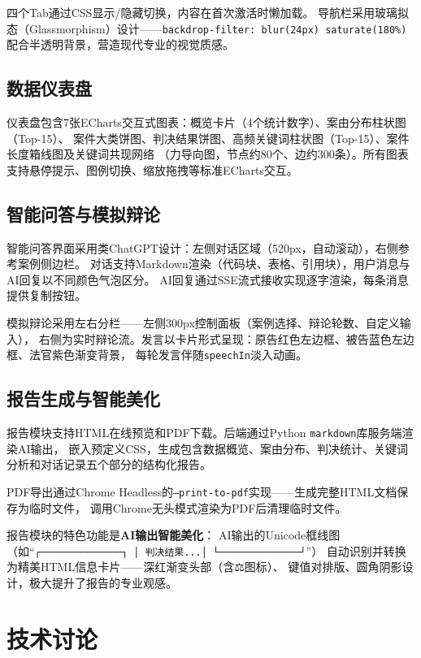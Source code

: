 \documentclass[12pt,a4paper,twoside]{ctexart}
\begin{document}
四个Tab通过CSS显示/隐藏切换，内容在首次激活时懒加载。
导航栏采用玻璃拟态（Glassmorphism）设计——\texttt{backdrop-filter: blur(24px) saturate(180\%)}
配合半透明背景，营造现代专业的视觉质感。

\subsection{数据仪表盘}

仪表盘包含7张ECharts交互式图表：概览卡片（4个统计数字）、案由分布柱状图（Top-15）、
案件大类饼图、判决结果饼图、高频关键词柱状图（Top-15）、案件长度箱线图及关键词共现网络
（力导向图，节点约80个、边约300条）。所有图表支持悬停提示、图例切换、缩放拖拽等标准ECharts交互。

\subsection{智能问答与模拟辩论}

智能问答界面采用类ChatGPT设计：左侧对话区域（520px，自动滚动），右侧参考案例侧边栏。
对话支持Markdown渲染（代码块、表格、引用块），用户消息与AI回复以不同颜色气泡区分。
AI回复通过SSE流式接收实现逐字渲染，每条消息提供复制按钮。

模拟辩论采用左右分栏——左侧300px控制面板（案例选择、辩论轮数、自定义输入），
右侧为实时辩论流。发言以卡片形式呈现：原告红色左边框、被告蓝色左边框、法官紫色渐变背景，
每轮发言伴随\texttt{speechIn}淡入动画。

\subsection{报告生成与智能美化}

报告模块支持HTML在线预览和PDF下载。后端通过Python \texttt{markdown}库服务端渲染AI输出，
嵌入预定义CSS，生成包含数据概览、案由分布、判决统计、关键词分析和对话记录五个部分的结构化报告。

PDF导出通过Chrome Headless的\texttt{--print-to-pdf}实现——生成完整HTML文档保存为临时文件，
调用Chrome无头模式渲染为PDF后清理临时文件。

报告模块的特色功能是\textbf{AI输出智能美化}：
AI输出的Unicode框线图（如``\texttt{┌──────────────┐ │ 判决结果...│ └──────────────┘}''）
自动识别并转换为精美HTML信息卡片——深红渐变头部（含⚖️图标）、
键值对排版、圆角阴影设计，极大提升了报告的专业观感。

\section{技术讨论}
\end{document}

